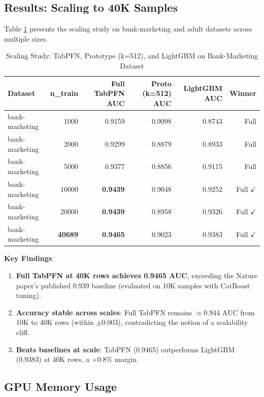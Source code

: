 \documentclass[11pt,a4paper]{article}
\begin{document}
\subsection{Results: Scaling to 40K Samples}

Table \ref{tab:scaling} presents the scaling study on bank-marketing and adult datasets across multiple sizes.

\begin{table}[h]
\centering
\caption{Scaling Study: TabPFN, Prototype (k=512), and LightGBM on Bank-Marketing Dataset}
\label{tab:scaling}
\begin{tabular}{lrrrrr}
\toprule
Dataset & n\_train & Full TabPFN AUC & Proto (k=512) AUC & LightGBM AUC & Winner \\
\midrule
bank-marketing & 1000 & 0.9159 & 0.9098 & 0.8743 & Full \\
bank-marketing & 2000 & 0.9299 & 0.8879 & 0.8933 & Full \\
bank-marketing & 5000 & 0.9377 & 0.8856 & 0.9115 & Full \\
bank-marketing & 10000 & \textbf{0.9439} & 0.9048 & 0.9252 & Full $\checkmark$ \\
bank-marketing & 20000 & \textbf{0.9439} & 0.8958 & 0.9326 & Full $\checkmark$ \\
bank-marketing & \textbf{40689} & \textbf{0.9465} & 0.9023 & 0.9383 & Full $\checkmark$ \\
\bottomrule
\end{tabular}
\end{table}

\textbf{Key Findings}:

\begin{enumerate}
\item \textbf{Full TabPFN at 40K rows achieves 0.9465 AUC}, exceeding the Nature paper's published 0.939 baseline (evaluated on 10K samples with CatBoost tuning).

\item \textbf{Accuracy stable across scales}: Full TabPFN remains $\approx 0.944$ AUC from 10K to 40K rows (within $\pm 0.003$), contradicting the notion of a scalability cliff.

\item \textbf{Beats baselines at scale}: TabPFN (0.9465) outperforms LightGBM (0.9383) at 40K rows, a +0.8\% margin.
\end{enumerate}

\subsection{GPU Memory Usage}
\end{document}
